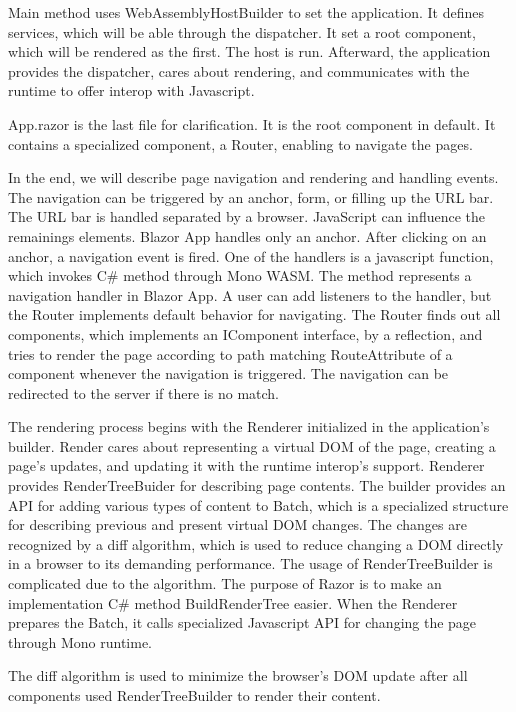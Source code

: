 \par
Main method uses WebAssemblyHostBuilder to set the application.
It defines services, which will be able through the dispatcher.
It set a root component, which will be rendered as the first.
The host is run.
Afterward, the application provides the dispatcher, cares about rendering, and communicates with the runtime to offer interop with Javascript.
\par
App.razor is the last file for clarification.
It is the root component in default.
It contains a specialized component, a Router, enabling to navigate the pages.
\par
In the end, we will describe page navigation and rendering and handling events.
The navigation  can be triggered by an anchor, form, or filling up the URL bar.
The URL bar is handled separated by a browser.
JavaScript can influence the remainings elements.
Blazor App handles only an anchor.
After clicking on an anchor, a navigation event is fired.
One of the handlers is a javascript function, which invokes C\# method through Mono WASM. 
The method represents a navigation handler in Blazor App.
A user can add listeners to the handler, but the Router implements default behavior for navigating.
The Router finds out all components, which implements an IComponent interface, by a reflection, and tries to render the page according to path matching RouteAttribute of a component whenever the navigation is triggered.
The navigation can be redirected to the server if there is no match.
\par
The rendering process begins with the Renderer initialized in the application's builder.
Render cares about representing a virtual DOM of the page, creating a page's updates, and updating it with the runtime interop's support.
Renderer provides RenderTreeBuider for describing page contents.
The builder provides an API for adding various types of content to Batch, which is a specialized structure for describing previous and present virtual DOM changes.
The changes are recognized by a diff algorithm, which is used to reduce changing a DOM directly in a browser to its demanding performance.
The usage of RenderTreeBuilder is complicated due to the algorithm.
The purpose of Razor is to make an implementation C\# method BuildRenderTree easier.
When the Renderer prepares the Batch, it calls specialized Javascript API for changing the page through Mono runtime.
\par
The diff algorithm is used to minimize the browser's DOM  update after all components used RenderTreeBuilder to render their content.
